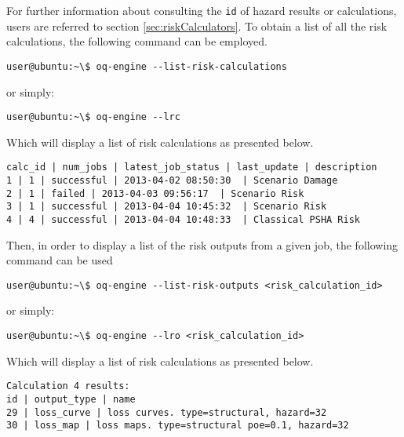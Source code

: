 For further information about consulting the \verb+id+ of hazard results or calculations, users are referred to section \ref{sec:riskCalculators}. To obtain a list of all the risk calculations, the following command can be employed.

\begin{Verbatim}[frame=single, commandchars=\\\{\}, samepage=true]
user@ubuntu:~\$ oq-engine --list-risk-calculations
\end{Verbatim}

or simply:

\begin{Verbatim}[frame=single, commandchars=\\\{\}, samepage=true]
user@ubuntu:~\$ oq-engine --lrc
\end{Verbatim}

Which will display a list of risk calculations as presented below.

\begin{Verbatim}[frame=single, commandchars=\\\{\}, samepage=true]
calc_id | num_jobs | latest_job_status | last_update | description
1 | 1 | successful | 2013-04-02 08:50:30  | Scenario Damage
2 | 1 | failed | 2013-04-03 09:56:17  | Scenario Risk
3 | 1 | successful | 2013-04-04 10:45:32  | Scenario Risk
4 | 4 | successful | 2013-04-04 10:48:33  | Classical PSHA Risk
\end{Verbatim}

Then, in order to display a list of the risk outputs from a given job, the following command can be used

\begin{Verbatim}[frame=single, commandchars=\\\{\}, samepage=true]
user@ubuntu:~\$ oq-engine --list-risk-outputs <risk_calculation_id>
\end{Verbatim}

or simply:

\begin{Verbatim}[frame=single, commandchars=\\\{\}, samepage=true]
user@ubuntu:~\$ oq-engine --lro <risk_calculation_id>
\end{Verbatim}

Which will display a list of risk calculations as presented below.

\begin{Verbatim}[frame=single, commandchars=\\\{\}, samepage=true]
Calculation 4 results:
id | output_type | name
29 | loss_curve | loss curves. type=structural, hazard=32
30 | loss_map | loss maps. type=structural poe=0.1, hazard=32
\end{Verbatim}


